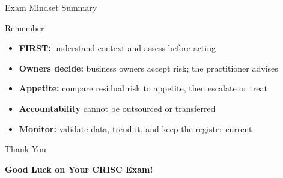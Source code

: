 \documentclass[aspectratio=169]{beamer}
\begin{document}
	\begin{frame}{Exam Mindset Summary}
		\begin{block}{Remember}
			\begin{itemize}
				\item \textbf{FIRST:} understand context and assess before acting
				\item \textbf{Owners decide:} business owners accept risk; the practitioner advises
				\item \textbf{Appetite:} compare residual risk to appetite, then escalate or treat
				\item \textbf{Accountability} cannot be outsourced or transferred
				\item \textbf{Monitor:} validate data, trend it, and keep the register current
			\end{itemize}
		\end{block}
	\end{frame}
	
	\begin{frame}{Thank You}
		\begin{center}
			{\Huge \textbf{Good Luck on Your CRISC Exam!}}
		\end{center}
	\end{frame}
	
\end{document}
